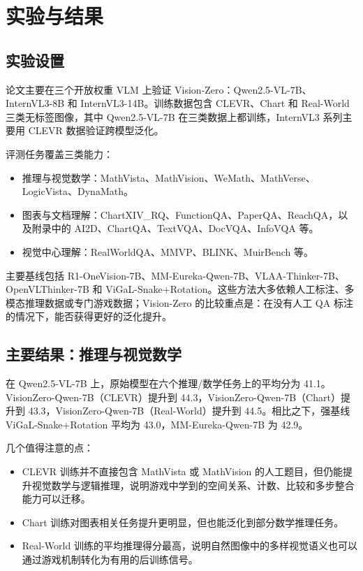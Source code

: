 \section{实验与结果}

\subsection{实验设置}

论文主要在三个开放权重 VLM 上验证 Vision-Zero：Qwen2.5-VL-7B、InternVL3-8B 和 InternVL3-14B。训练数据包含 CLEVR、Chart 和 Real-World 三类无标签图像，其中 Qwen2.5-VL-7B 在三类数据上都训练，InternVL3 系列主要用 CLEVR 数据验证跨模型泛化。

评测任务覆盖三类能力：

\begin{itemize}
    \item 推理与视觉数学：MathVista、MathVision、WeMath、MathVerse、LogicVista、DynaMath。
    \item 图表与文档理解：ChartXIV\_RQ、FunctionQA、PaperQA、ReachQA，以及附录中的 AI2D、ChartQA、TextVQA、DocVQA、InfoVQA 等。
    \item 视觉中心理解：RealWorldQA、MMVP、BLINK、MuirBench 等。
\end{itemize}

主要基线包括 R1-OneVision-7B、MM-Eureka-Qwen-7B、VLAA-Thinker-7B、OpenVLThinker-7B 和 ViGaL-Snake+Rotation。这些方法大多依赖人工标注、多模态推理数据或专门游戏数据；Vision-Zero 的比较重点是：在没有人工 QA 标注的情况下，能否获得更好的泛化提升。

\subsection{主要结果：推理与视觉数学}

在 Qwen2.5-VL-7B 上，原始模型在六个推理/数学任务上的平均分为 41.1。VisionZero-Qwen-7B（CLEVR）提升到 44.3，VisionZero-Qwen-7B（Chart）提升到 43.3，VisionZero-Qwen-7B（Real-World）提升到 44.5。相比之下，强基线 ViGaL-Snake+Rotation 平均为 43.0，MM-Eureka-Qwen-7B 为 42.9。

几个值得注意的点：

\begin{itemize}
    \item CLEVR 训练并不直接包含 MathVista 或 MathVision 的人工题目，但仍能提升视觉数学与逻辑推理，说明游戏中学到的空间关系、计数、比较和多步整合能力可以迁移。
    \item Chart 训练对图表相关任务提升更明显，但也能泛化到部分数学推理任务。
    \item Real-World 训练的平均推理得分最高，说明自然图像中的多样视觉语义也可以通过游戏机制转化为有用的后训练信号。
\end{itemize}


